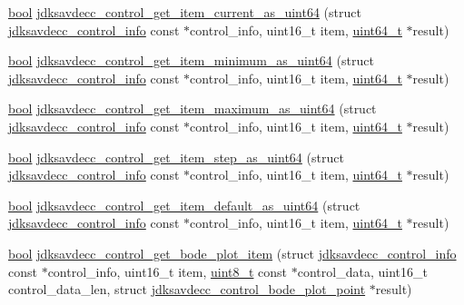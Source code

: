 \begin{DoxyCompactItemize}
\item 
\hyperlink{avb__gptp_8h_af6a258d8f3ee5206d682d799316314b1}{bool} \hyperlink{group__aem__control__value__helpers_gab428facb8c001ad8f6b44c8c232c8166}{jdksavdecc\+\_\+control\+\_\+get\+\_\+item\+\_\+current\+\_\+as\+\_\+uint64} (struct \hyperlink{structjdksavdecc__control__info}{jdksavdecc\+\_\+control\+\_\+info} const $\ast$control\+\_\+info, uint16\+\_\+t item, \hyperlink{parse_8c_aec6fcb673ff035718c238c8c9d544c47}{uint64\+\_\+t} $\ast$result)
\item 
\hyperlink{avb__gptp_8h_af6a258d8f3ee5206d682d799316314b1}{bool} \hyperlink{group__aem__control__value__helpers_ga3195ecfff6be56cbdf05e6d7de8a48c1}{jdksavdecc\+\_\+control\+\_\+get\+\_\+item\+\_\+minimum\+\_\+as\+\_\+uint64} (struct \hyperlink{structjdksavdecc__control__info}{jdksavdecc\+\_\+control\+\_\+info} const $\ast$control\+\_\+info, uint16\+\_\+t item, \hyperlink{parse_8c_aec6fcb673ff035718c238c8c9d544c47}{uint64\+\_\+t} $\ast$result)
\item 
\hyperlink{avb__gptp_8h_af6a258d8f3ee5206d682d799316314b1}{bool} \hyperlink{group__aem__control__value__helpers_gaa39ef32c84e84947906fa630a34b6c78}{jdksavdecc\+\_\+control\+\_\+get\+\_\+item\+\_\+maximum\+\_\+as\+\_\+uint64} (struct \hyperlink{structjdksavdecc__control__info}{jdksavdecc\+\_\+control\+\_\+info} const $\ast$control\+\_\+info, uint16\+\_\+t item, \hyperlink{parse_8c_aec6fcb673ff035718c238c8c9d544c47}{uint64\+\_\+t} $\ast$result)
\item 
\hyperlink{avb__gptp_8h_af6a258d8f3ee5206d682d799316314b1}{bool} \hyperlink{group__aem__control__value__helpers_gaaeffd004812f3e3765a40779fdbe2ee6}{jdksavdecc\+\_\+control\+\_\+get\+\_\+item\+\_\+step\+\_\+as\+\_\+uint64} (struct \hyperlink{structjdksavdecc__control__info}{jdksavdecc\+\_\+control\+\_\+info} const $\ast$control\+\_\+info, uint16\+\_\+t item, \hyperlink{parse_8c_aec6fcb673ff035718c238c8c9d544c47}{uint64\+\_\+t} $\ast$result)
\item 
\hyperlink{avb__gptp_8h_af6a258d8f3ee5206d682d799316314b1}{bool} \hyperlink{group__aem__control__value__helpers_ga52a28d337c7dd7743c9d39aa404b1972}{jdksavdecc\+\_\+control\+\_\+get\+\_\+item\+\_\+default\+\_\+as\+\_\+uint64} (struct \hyperlink{structjdksavdecc__control__info}{jdksavdecc\+\_\+control\+\_\+info} const $\ast$control\+\_\+info, uint16\+\_\+t item, \hyperlink{parse_8c_aec6fcb673ff035718c238c8c9d544c47}{uint64\+\_\+t} $\ast$result)
\item 
\hyperlink{avb__gptp_8h_af6a258d8f3ee5206d682d799316314b1}{bool} \hyperlink{group__aem__control__value__helpers_ga17d975d150864f4c4761ec54129d34b7}{jdksavdecc\+\_\+control\+\_\+get\+\_\+bode\+\_\+plot\+\_\+item} (struct \hyperlink{structjdksavdecc__control__info}{jdksavdecc\+\_\+control\+\_\+info} const $\ast$control\+\_\+info, uint16\+\_\+t item, \hyperlink{stdint_8h_aba7bc1797add20fe3efdf37ced1182c5}{uint8\+\_\+t} const $\ast$control\+\_\+data, uint16\+\_\+t control\+\_\+data\+\_\+len, struct \hyperlink{structjdksavdecc__control__bode__plot__point}{jdksavdecc\+\_\+control\+\_\+bode\+\_\+plot\+\_\+point} $\ast$result)

\end{DoxyCompactItemize}

